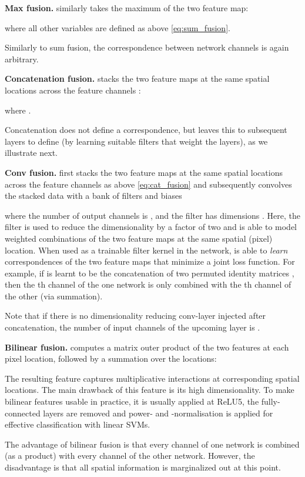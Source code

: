 \documentclass[10pt,twocolumn,letterpaper]{article}
\begin{document}
\textbf{Max fusion.}  similarly takes the maximum of the two feature map: 

where all other variables are defined as above \eqref{eq:sum_fusion}.

Similarly to sum fusion, the correspondence between network channels is again
arbitrary.

\textbf{Concatenation fusion.}  stacks the two feature maps at the same spatial locations  across the feature channels : 

where . 

Concatenation does not define a correspondence, but leaves this to subsequent 
layers to define (by learning suitable filters that weight the layers), as we
illustrate next.

\textbf{Conv fusion.}  first stacks the two feature maps at the same spatial locations  across the feature channels  as above \eqref{eq:cat_fusion} and subsequently convolves the stacked data with a bank of filters  and biases 

where the number of output channels is , and the filter has dimensions
.
Here, the filter  is used to reduce the dimensionality by a
factor of two and is able to model weighted combinations of the two
feature maps  at the same spatial (pixel) location. When used
as a trainable filter kernel in the network,  is able to {\em
	learn} correspondences of the two feature maps that minimize a joint
loss function. For example, if  is learnt to be the
concatenation of two permuted identity matrices
, then the th channel
of the one network is only combined with the th channel of the other (via summation).  

Note that if there is no dimensionality reducing conv-layer injected
after concatenation, the number of input channels of the upcoming
layer is .


\textbf{Bilinear fusion.}  computes a matrix outer product of the two features at each pixel location, followed by a summation over the locations:

The resulting feature  captures
multiplicative interactions at corresponding spatial locations. The
main drawback of this feature is its high dimensionality. To make
bilinear features usable in practice, it is usually applied at ReLU5, the fully-connected layers
are removed \cite{lin2015bilinear} and power- and -normalisation is
applied for effective classification with linear SVMs.

The advantage of bilinear fusion is that every channel of one network
is combined (as a product) with every channel of the other
network. However, the disadvantage is that all spatial information is
marginalized out at this point.
\end{document}
